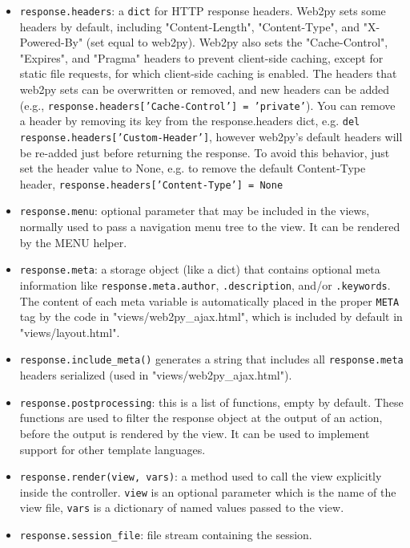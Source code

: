 \documentclass[justified,sixbynine,notoc]{tufte-book}
\def\ft{\small\tt}
\begin{document}
\begin{fullwidth}
\begin{itemize}
\item {\ft response.headers}: a {\ft dict} for HTTP response headers. Web2py sets some headers by default, including "Content-Length", "Content-Type", and "X-Powered-By" (set equal to web2py). Web2py also sets the "Cache-Control", "Expires", and "Pragma" headers to prevent client-side caching, except for static file requests, for which client-side caching is enabled. The headers that web2py sets can be overwritten or removed, and new headers can be added (e.g., {\ft response.headers['Cache-Control'] = 'private'}). You can remove a header by removing its key from the response.headers dict, e.g. {\ft del response.headers['Custom-Header']}, however web2py's default headers will be re-added just before returning the response. To avoid this behavior, just set the header value to None, e.g. to remove the default Content-Type header, {\ft response.headers['Content-Type'] = None}

\item {\ft response.menu}: optional parameter that may be included in the views, normally used to pass a navigation menu tree to the view. It can be rendered by the MENU helper.

\item {\ft response.meta}: a storage object (like a dict) that contains optional meta information like {\ft response.meta.author}, {\ft .description}, and/or {\ft .keywords}. The content of each meta variable is automatically placed in the proper {\ft META} tag by the code in "views/web2py\_ajax.html", which is included by default in "views/layout.html".

\item {\ft response.include\_meta()} generates a string that includes all {\ft response.meta} headers serialized (used in "views/web2py\_ajax.html").

\item {\ft response.postprocessing}: this is a list of functions, empty by default. These functions are used to filter the response object at the output of an action, before the output is rendered by the view. It can be used to implement support for other template languages.

\item {\ft response.render(view, vars)}: a method used to call the view explicitly inside the controller. {\ft view} is an optional parameter which is the name of the view file, {\ft vars} is a dictionary of named values passed to the view.

\item {\ft response.session\_file}: file stream containing the session.


\end{itemize}
\end{fullwidth}
\end{document}
